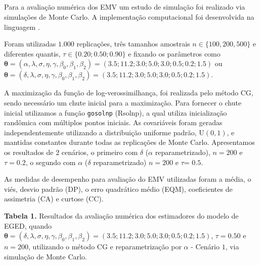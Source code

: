 \documentclass{sciposter}
\begin{document}
\begin{multicols}{3}
{\section*{}
\vspace{0.2cm}
Para a avaliação numérica dos EMV um estudo de simulação foi realizado via simulações de Monte Carlo. A implementação computacional foi desenvolvida na linguagem \cite{R2022}. 

Foram utilizadas $1.000$ replicações, três tamanhos amostrais $n \in \{100, 200, 500\}$ e diferentes quantis, $\tau \in \{0.20; 0.50; 0.90\}$ e fixando os parâmetros como $\bm{\theta} = (\alpha, \lambda,\sigma,\eta,\gamma,\beta_0,\beta_1,\beta_2)=(3.5; 11.2; 3.0; 5.0; 3.0; 0.5; 0.2; 1.5)$ ou $\bm{\theta} = (\delta, \lambda,\sigma,\eta,\gamma,\beta_0,\beta_1,\beta_2)=(3.5; 11.2; 3.0; 5.0; 3.0; 0.5; 0.2; 1.5)$. 

A maximização da função de log-verossimilhança, foi realizada pelo método CG, sendo necessário um chute inicial para a maximização. Para fornecer o chute inicial utilizamos a função {\tt gosolnp} (Rsolnp), a qual utiliza inicialização randômica com múltiplos pontos iniciais. As covariáveis foram geradas independentemente utilizando a distribuição uniforme padrão, $\mbox{U} (0, 1)$, e mantidas constantes durante todas as replicações de Monte Carlo. Apresentamos os resultados de $2$ cenários, o primeiro com $\delta$ ($\alpha$ reparametrizado),  $n =200$ e $\tau = 0.2$, o segundo com $\alpha$ ($\delta$ reparametrizado) $n = 200$ e $\tau$= $0.5$.

As medidas de desempenho para avaliação do EMV utilizadas foram a média, o viés, desvio padrão (DP), o erro quadrático médio (EQM), coeficientes de assimetria (CA) e curtose (CC).


\textbf{Tabela 1.} Resultados da avaliação numérica dos estimadores do modelo de EGED, quando $\bm{\theta} = (\delta, \lambda,\sigma,\eta,\gamma,\beta_0,\beta_1,\beta_2)=(3.5; 11.2; 3.0; 5.0; 3.0; 0.5; 0.2; 1.5)$, $\tau =0.50$ e $n=200$, utilizando o método CG e reparametrização por $\alpha$ - Cenário $1$, via  simulação de Monte Carlo.

\begin{table}[H]


\end{table}}
\end{multicols}
\end{document}

